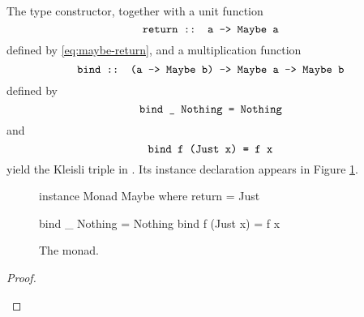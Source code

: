 \begin{example}
  \label{ex:triple-maybe-haskell}

  The  type constructor, together with a unit
  function
  \begin{equation*}
    \text{\texttt{return :: a -> Maybe a}}
  \end{equation*}
  defined by \eqref{eq:maybe-return}, and a multiplication function
  \begin{equation*}
    \text{\texttt{bind :: (a -> Maybe b) -> Maybe a -> Maybe b}}
  \end{equation*}
  defined by
  \begin{equation}
    \label{eq:maybe-bind-nothing}
    \text{\texttt{bind \_ Nothing = Nothing}}
  \end{equation}
  and
  \begin{equation}
    \label{eq:maybe-bind-just}
    \text{\texttt{bind f (Just x) = f x}}
  \end{equation}
  yield the  Kleisli triple in \hask. Its instance
  declaration appears in Figure \ref{fig:triple-maybe-haskell}.

  \begin{figure}[htbp]
    \begin{codehaskell}
instance Monad Maybe where
  return = Just

  bind _ Nothing  = Nothing
  bind f (Just x) = f x
    \end{codehaskell}
    \caption{The  monad.}
    \label{fig:triple-maybe-haskell}
  \end{figure}

  \begin{proof}

    \hfill
    \begin{steps}
    \end{steps}

    \begin{steps}
    \end{steps}

    \begin{steps}
    \end{steps}


\end{proof}
\end{example}
